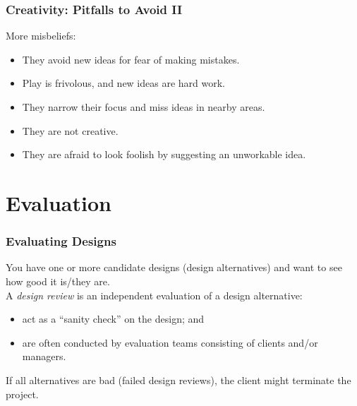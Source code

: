 \begin{frame}
\frametitle{Creativity: Pitfalls to Avoid II}

\begin{changemargin}{1em}
More misbeliefs:
\begin{itemize}
\item They avoid new ideas for fear of making mistakes.
\item Play is frivolous, and new ideas are hard work.
\item They narrow their focus and miss ideas in nearby areas.
\item They are not creative.
\item They are afraid to look foolish by suggesting an unworkable idea.
\end{itemize}
\end{changemargin}

\end{frame}

\section{Evaluation}

\begin{frame}
\frametitle{Evaluating Designs}

\begin{changemargin}{2em}
You have one or more candidate designs (design alternatives) and want
to see how good it is/they are.\\[1em]

A \emph{design review} is an independent evaluation of a design alternative:
\begin{itemize}
\item act as a ``sanity check'' on the design; and 
\item are often conducted by evaluation teams consisting of clients and/or
managers.
\end{itemize}
If all alternatives are bad (failed design reviews), the client might
terminate the project.
\end{changemargin}

\end{frame}

